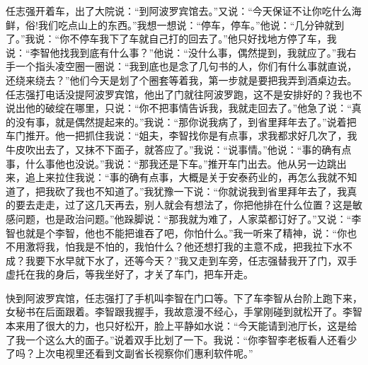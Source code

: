 \documentclass[12pt,oneside]{book}
\begin{document}
任志强开着车，出了大院说：``到阿波罗宾馆去。''又说：``今天保证不让你吃什么海鲜，俗!我们吃点山上的东西。''我想一想说：``停车，停车。''他说：``几分钟就到了。''我说：``你不停车我下了车就自己打的回去了。''他只好找地方停了车，我说：``李智他找我到底有什么事？''他说：``没什么事，偶然提到，我就应了。''我右手一个指头凌空圈一圈说：``我到底也是念了几句书的人，你们有什么事就直说，还绕来绕去？''他们今天是划了个圈套等着我，第一步就是要把我弄到酒桌边去。任志强打电话没提阿波罗宾馆，他出了门就往阿波罗跑，这不是安排好的？我也不说出他的破绽在哪里，只说：``你不把事情告诉我，我就走回去了。''他急了说：``真的没有事，就是偶然提起来的。''我说：``那你说我病了，到省里拜年去了。''说着把车门推开。他一把抓住我说：``姐夫，李智找你是有点事，求我都求好几次了，我牛皮吹出去了，又抹不下面子，就答应了。''我说：``说事情。''他说：``事的确有点事，什么事他也没说。''我说：``那我还是下车。''推开车门出去。他从另一边跳出来，追上来拉住我说：``事的确有点事，大概是关于安泰药业的，再怎么我就不知道了，把我砍了我也不知道了。''我犹豫一下说：``你就说我到省里拜年去了，我真的要去走走，过了这几天再去，别人就会有想法了，你把他排在什么位置？这是敏感问题，也是政治问题。''他跺脚说：``那我就为难了，人家菜都订好了。''又说：``李智也就是个李智，他也不能把谁吞了吧，你怕什么。''我一听来了精神，说：``你也不用激将我，怕我是不怕的，我怕什么？他还想打我的主意不成，把我拉下水不成？我要下水早就下水了，还等今天？''我又走到车旁，任志强替我开了门，双手虚托在我的身后，等我坐好了，才关了车门，把车开走。

快到阿波罗宾馆，任志强打了手机叫李智在门口等。下了车李智从台阶上跑下来，女秘书在后面跟着。李智跟我握手，我故意漫不经心，手掌刚碰到就松开了。李智本来用了很大的力，也只好松开，脸上平静如水说：``今天能请到池厅长，这是给了我一个这么大的面子。''说着双手比划了一下。我说：``你李智李老板看人还看少了吗？上次电视里还看到文副省长视察你们惠利软件呢。''
\end{document}
